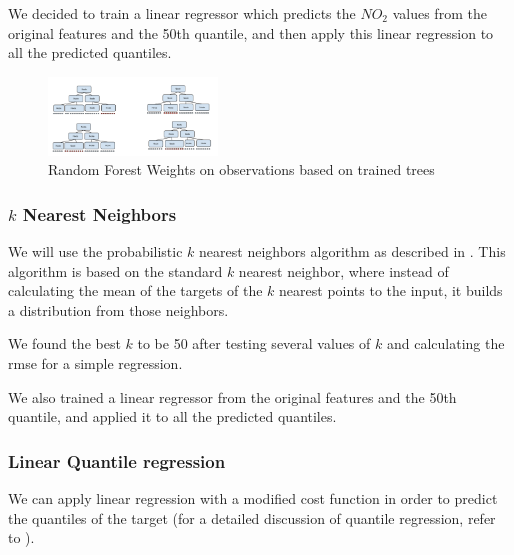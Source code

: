 \documentclass[a4paper,twocolumn,5p]{elsarticle}
\begin{document}
We decided to train a linear regressor
which predicts the $NO_2$ values from the original features and the 50th quantile, 
and then apply this linear regression 
to all the predicted quantiles. 

\begin{figure}
  \centering
  \includegraphics[width=0.4\textwidth]{quantile_random_forest}
  \caption{Random Forest Weights on observations based on trained trees}
  \label{figure:qrandom}
\end{figure}

\subsubsection{$k$ Nearest Neighbors}

We will use the probabilistic $k$ nearest neighbors algorithm as described in  
\cite{quantileknnmangalova}. 
This algorithm is based on the standard $k$ nearest neighbor, 
where instead of calculating the mean of 
the targets of the
$k$ nearest points to the input, it builds a distribution 
from those neighbors.

We found the best $k$ to be 50 after testing several values of $k$ and calculating 
the rmse for a simple regression.

We also trained a linear regressor from the original features and the 50th quantile, 
and applied it to all the predicted quantiles. 

\subsubsection{Linear Quantile regression}

We can apply linear regression with a modified cost function in order to 
predict the quantiles of the target (for a detailed discussion of 
quantile regression, refer to \cite{koenker_quantile_2001}). 
\end{document}
